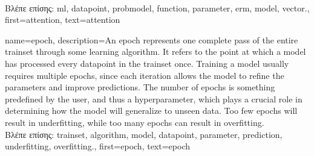 {{%
		\\
		\foreignlanguage{greek}{Βλέπε επίσης:} \gls{ml}, \gls{datapoint}, \gls{probmodel}, \gls{function}, \gls{parameter}, \gls{erm}, \gls{model}, \gls{vector}.},
	first={attention},
	text={attention}
}

{name={epoch},
	description={An epoch represents one complete pass of the entire \gls{trainset} through some learning 
		\gls{algorithm}. It refers to the point at which a \gls{model} has processed every \gls{datapoint} in the \gls{trainset} once. 
		Training a \gls{model} usually requires multiple epochs, since each iteration allows the \gls{model} to refine the 
		\gls{parameter}s and improve \gls{prediction}s. The number of epochs is something predefined by the user,  
		and thus a hyperparameter, which plays a crucial role in determining how the \gls{model} will generalize to unseen \gls{data}. 
		Too few epochs will result in \gls{underfitting}, while too many epochs can result in \gls{overfitting}. \\
		\foreignlanguage{greek}{Βλέπε επίσης:} \gls{trainset}, \gls{algorithm}, \gls{model}, \gls{datapoint}, \gls{parameter}, 
		\gls{prediction}, \gls{underfitting}, \gls{overfitting}.},
	first={epoch},
	text={epoch}
}


